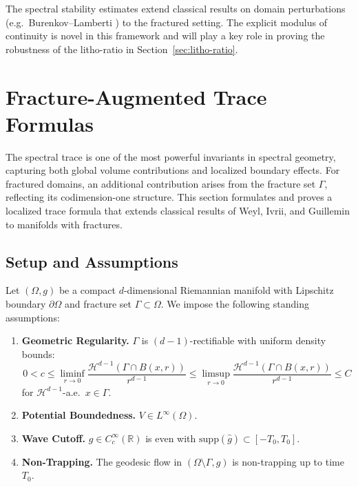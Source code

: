\begin{remark}
The spectral stability estimates extend classical results on domain
perturbations (e.g.\ Burenkov--Lamberti \cite{BurenkovLamberti2006}) to the
fractured setting. The explicit modulus of continuity is novel in this
framework and will play a key role in proving the robustness of the litho-ratio
in Section~\ref{sec:litho-ratio}.
\end{remark}

\section{Fracture-Augmented Trace Formulas}
\label{sec:fracture-trace}

The spectral trace is one of the most powerful invariants in spectral geometry,
capturing both global volume contributions and localized boundary effects. For
fractured domains, an additional contribution arises from the fracture set
$\Gamma$, reflecting its codimension-one structure. This section formulates and
proves a localized trace formula that extends classical results of Weyl,
Ivrii, and Guillemin to manifolds with fractures.

\subsection{Setup and Assumptions}
Let $(\Omega,g)$ be a compact $d$-dimensional Riemannian manifold with
Lipschitz boundary $\partial\Omega$ and fracture set $\Gamma\subset\Omega$.
We impose the following standing assumptions:

\begin{enumerate}[label=(H\arabic*)]
\item \textbf{Geometric Regularity.} $\Gamma$ is $(d-1)$-rectifiable with
uniform density bounds:
\[
0 < c \leq \liminf_{r\to 0}\frac{\mathcal{H}^{d-1}(\Gamma\cap B(x,r))}{r^{d-1}}
  \leq \limsup_{r\to 0}\frac{\mathcal{H}^{d-1}(\Gamma\cap B(x,r))}{r^{d-1}} \leq C
\]
for $\mathcal{H}^{d-1}$-a.e.\ $x\in\Gamma$.
\item \textbf{Potential Boundedness.} $V\in L^\infty(\Omega)$.
\item \textbf{Wave Cutoff.} $g\in C_c^\infty(\mathbb{R})$ is even with
$\mathrm{supp}(\widehat{g})\subset [-T_0,T_0]$.
\item \textbf{Non-Trapping.} The geodesic flow in $(\Omega\setminus\Gamma,g)$
is non-trapping up to time $T_0$.
\end{enumerate}

